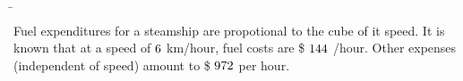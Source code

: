 


\CUBE\vs\va
\FRACTIONSIMPLIFY\vf\va\p\q
\FRACMULT\p{}\vb\vc
\FRACMULT\vc\vb{}\a\b
\MULTIPLY{}\vp

\CUBE\vm\vn
\FRACMULT\p\q{}\vx\vy
\FRACADD\vx\vy{}\vv\vw

\question Fuel expenditures for a steamship are propotional to the cube of it speed.
It is known that at a speed of $6$ km/hour, fuel costs are \$ $144$ /hour. Other 
expenses (independent of speed) amount to \$ $972$ per hour. 

\watchout

